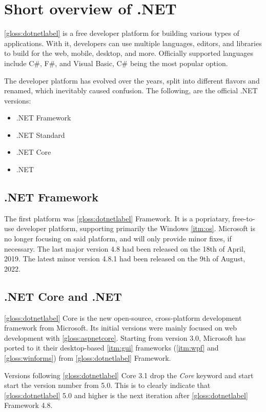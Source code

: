 \chapter{Short overview of .NET} \label{chap:overviewNET}
\ref{gloss:dotnetlabel} is a free developer platform for building various types of applications. With it, developers can use multiple languages, editors, and libraries to build for the web, mobile, desktop, and more.
Officially supported languages include C\#, F\#, and Visual Basic, C\# being the most popular option.

The developer platform has evolved over the years, split into different flavors and renamed, which inevitably caused confusion.
The following, are the official .NET versions:
\begin{itemize}
    \item .NET Framework
    \item .NET Standard
    \item .NET Core
    \item .NET
\end{itemize}

\section{.NET Framework}

The first platform was \ref{gloss:dotnetlabel} Framework. It is a popriatary, free-to-use developer platform, supporting primarily the Windows \ref{itm:os}. Microsoft is no longer focusing on said platform, and will only provide minor fixes, if necessary. The last major version 4.8 had been released on the 18th of April, 2019. The latest minor version 4.8.1 had been released on the 9th of August, 2022.

\section{.NET Core and .NET}

\ref{gloss:dotnetlabel} Core is the new open-source, cross-platform development framework from Microsoft. Its initial versions were mainly focused on web development with \ref{gloss:aspnetcore}. Starting from version 3.0, Microsoft has ported to it their desktop-based \ref{itm:gui} frameworks (\ref{itm:wpf} and \ref{gloss:winforms}) from \ref{gloss:dotnetlabel} Framework.

Versions following \ref{gloss:dotnetlabel} Core 3.1 drop the \textit{Core} keyword and start start the version number from 5.0. This is to clearly indicate that \ref{gloss:dotnetlabel} 5.0 and higher is the next iteration after \ref{gloss:dotnetlabel} Framework 4.8.

